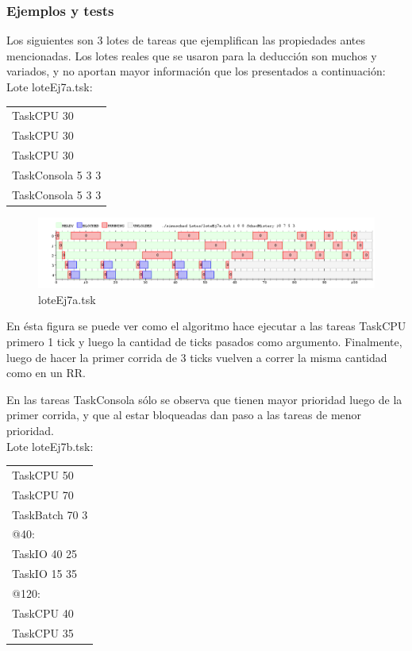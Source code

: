 \subsubsection{Ejemplos y tests}

Los siguientes son 3 lotes de tareas que ejemplifican las propiedades antes mencionadas. Los lotes reales que se usaron para la deducci\'on son muchos y variados, y no aportan mayor informaci\'on que los presentados a continuaci\'on:\\
\newpage
Lote loteEj7a.tsk:
\begin{table}[H]
\begin{tabular}{ | l |}
  \hline
TaskCPU 30\\
TaskCPU 30\\
TaskCPU 30\\
TaskConsola 5 3 3\\
TaskConsola 5 3 3\\
  \hline
\end{tabular}
\end{table}

\begin{figure}[H]
  \centering
    \includegraphics[width=1.1\textwidth]{imagenes/test3ej7.png}
 \caption{loteEj7a.tsk}
  \label{fig:ej7a}
\end{figure}

En \'esta figura se puede ver como el algoritmo hace ejecutar a las tareas TaskCPU primero 1 tick y luego la cantidad de ticks pasados como argumento. Finalmente, luego de hacer la primer corrida de 3 ticks vuelven a correr la misma cantidad como en un RR.

En las tareas TaskConsola s\'olo se observa que tienen mayor prioridad luego de la primer corrida, y que al estar bloqueadas dan paso a las tareas de menor prioridad.\\



Lote loteEj7b.tsk:
\begin{table}[H]
\begin{tabular}{ | l |}
  \hline
TaskCPU 50\\
TaskCPU 70\\
TaskBatch 70 3\\
@40:\\
TaskIO 40 25\\
TaskIO 15 35\\
@120:\\
TaskCPU 40\\
TaskCPU 35\\
  \hline
\end{tabular}
\end{table}

